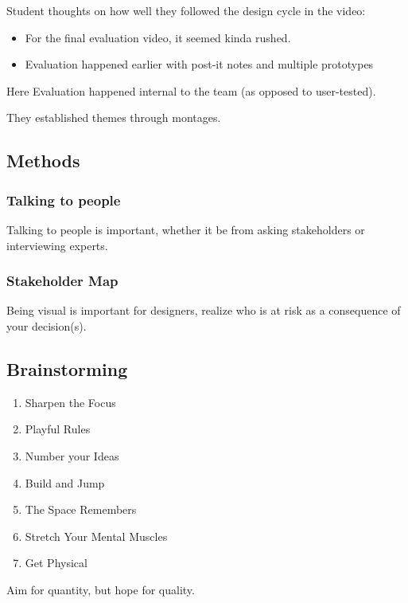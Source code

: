 Student thoughts on how well they followed the design cycle in the video:
\begin{itemize}
    \item For the final evaluation video, it seemed kinda rushed.
    \item Evaluation happened earlier with post-it notes and multiple prototypes
\end{itemize}
Here Evaluation happened internal to the team (as opposed to user-tested).

They established themes through montages.

\subsection{Methods}
\subsubsection{Talking to people}
Talking to people is important, whether it be from asking stakeholders or interviewing experts.

\subsubsection{Stakeholder Map}
Being visual is important for designers, realize who is at risk as a consequence of your decision(s).

\subsection{Brainstorming}
\begin{enumerate}
    \item Sharpen the Focus
    \item Playful Rules
    \item Number your Ideas
    \item Build and Jump
    \item The Space Remembers
    \item Stretch Your Mental Muscles
    \item Get Physical
\end{enumerate}

\begin{shaded}
Aim for quantity, but hope for quality.
\end{shaded}
